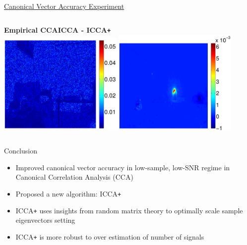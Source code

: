 \documentclass[8pt]{beamer}
\newcommand{\iccap}{ICCA\texttt{+} }
\begin{document}
\begin{frame}{\href{run:/home/asendorf/Documents/thesis_videos/flashing_video2.mp4}{Canonical Vector Accuracy Experiment}}
\begin{columns}[T]
\begin{column}{0.7\textwidth}
\begin{center}
      \hspace{-2ex}\textbf{Empirical CCA}\hspace{13ex}\textbf{ICCA - \iccap}\\
      \includegraphics[width=0.45\textwidth]{figures/flashing1_left1_cca.pdf}\hspace{2ex}
      \includegraphics[width=0.45\textwidth]{figures/flashing1_left1_diff_icca.pdf}
    \end{center}
  \end{column}
\end{columns}
\end{frame}

\begin{frame}{Conclusion}
  \begin{itemize}
  \item Improved canonical vector accuracy in low-sample, low-SNR regime in Canonical
    Correlation Analysis (CCA)
  \item Proposed a new algorithm: \iccap
  \item \iccap uses insights from random matrix theory to optimally scale sample
    eigenvectors 
    setting 
  \item \iccap is more robust to over estimation of number of signals
  \end{itemize}
\end{frame}
\end{document}
